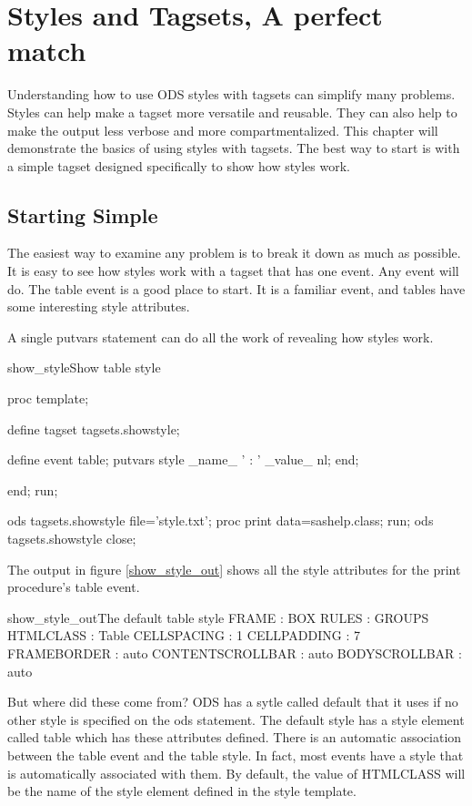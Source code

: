\chapter{Styles and Tagsets, A perfect match}
Understanding how to use ODS styles with tagsets can
simplify many problems.  Styles can help make
a tagset more versatile and reusable.  They can
also help to make the output less verbose and
more compartmentalized. This chapter 
will demonstrate the basics of using styles 
with tagsets.   The best way to start is with
a simple tagset designed specifically
to show how styles work.  


\section{Starting Simple}
The easiest way to examine any problem is to break it down
as much as possible.  It is easy to see how styles work with a
tagset that has one event.  Any event will do. 
The table event is a good place to start.
It is a familiar event, and tables have some
interesting style attributes.  

A single putvars statement can do all the work of revealing how styles work.

\begin{fvcode}{show_style}{Show table style}

proc template;

    define tagset tagsets.showstyle;

        define event table;
            putvars style _name_ ' : ' _value_ nl;
        end;

     end;
run;

ods tagsets.showstyle file='style.txt';
proc print data=sashelp.class; run;
ods tagsets.showstyle close;

\end{fvcode}

The output in figure \ref{show_style_out} shows all the style
attributes for the print procedure's table event.

\begin{poutput}{show_style_out}{The default table style}
FRAME : BOX
RULES : GROUPS
HTMLCLASS : Table
CELLSPACING : 1
CELLPADDING : 7
FRAMEBORDER : auto
CONTENTSCROLLBAR : auto
BODYSCROLLBAR : auto
\end{poutput}

But where did these come from?  ODS has a sytle called default
that it uses if no other style is specified on the ods statement.
The default style has a style element called table which has these
attributes defined.  There is an automatic association between the
table event and the table style.  In fact, most events have a
style that is automatically associated with them.  By default, the
value of HTMLCLASS will be the name of the style element defined in
the style template.


